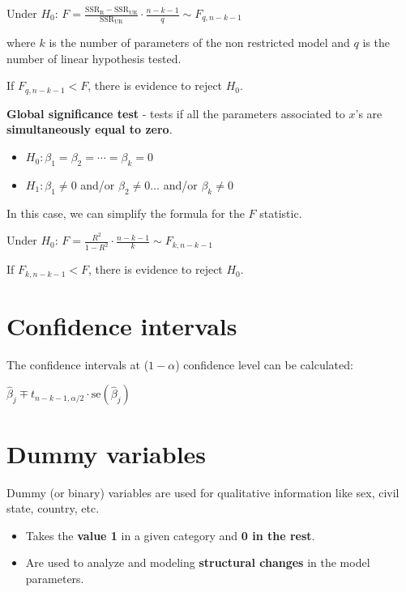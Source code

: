 \documentclass[10pt, a4paper, landscape]{extarticle}
\newcommand{\se}{\mathrm{se}}
\newcommand{\SSR}{\mathrm{SSR}}
\begin{document}
\begin{multicols}{3}
\begin{center}
	Under $H_0$: \quad $F = \frac{\SSR_\mathrm{R} - \SSR_\mathrm{UR}}{\SSR_\mathrm{UR}} \cdot \frac{n - k - 1}{q} \sim F_{q, n - k - 1}$
\end{center}

where $k$ is the number of parameters of the non restricted model and $q$ is the number of linear hypothesis tested.

If $F_{q, n - k - 1} < F$, there is evidence to reject $H_0$.

\textbf{Global significance test} - tests if all the parameters associated to $x$'s are \textbf{simultaneously equal to zero}.

\begin{itemize}[leftmargin=*]
	\item $H_0: \beta_1 = \beta_2 = \cdots = \beta_k = 0$
	\item $H_1: \beta_1 \neq 0$ and/or $\beta_2 \neq 0 \ldots$ and/or $\beta_k \neq 0$
\end{itemize}

In this case, we can simplify the formula for the $F$ statistic.

\begin{center}
	Under $H_0$: \quad $F = \frac{R^2}{1 - R^2} \cdot \frac{n - k - 1}{k} \sim F_{k, n - k - 1}$
\end{center}

If $F_{k, n - k - 1} < F$, there is evidence to reject $H_0$.

\section*{Confidence intervals}

The confidence intervals at ($1 - \alpha$) confidence level can be calculated:

\begin{center}
	$\hat{\beta}_j \mp t_{n - k - 1, \alpha/2} \cdot \se(\hat{\beta}_j)$
\end{center}

\section*{Dummy variables}

Dummy (or binary) variables are used for qualitative information like sex, civil state, country, etc.

\begin{itemize}[leftmargin=*]
	\item Takes the \textbf{value 1} in a given category and \textbf{0 in the rest}.
	\item Are used to analyze and modeling \textbf{structural changes} in the model parameters.
\end{itemize}


\end{multicols}
\end{document}
